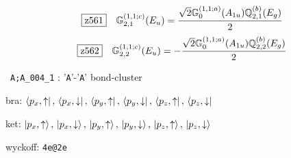 \documentclass[fleqn,10pt,landscape]{jsarticle}
\begin{document}
\begin{dmath*}
\hspace*{3mm}\fbox{z561}\quad \mathbb{G}_{2,1}^{(1,1;c)}(E_{u})=\frac{\sqrt{2} \mathbb{G}_{0}^{(1,1;a)}(A_{1u}) \mathbb{Q}_{2,1}^{(b)}(E_{g})}{2}
\end{dmath*}
\begin{dmath*}
\hspace*{3mm}\fbox{z562}\quad \mathbb{G}_{2,2}^{(1,1;c)}(E_{u})=- \frac{\sqrt{2} \mathbb{G}_{0}^{(1,1;a)}(A_{1u}) \mathbb{Q}_{2,2}^{(b)}(E_{g})}{2}
\end{dmath*}
\vspace{5mm}

\noindent\textbullet\, \texttt{A;A_004_1} : '\texttt{A}'-'\texttt{A}' bond-cluster

\noindent\quad * bra: $\bra{p_{x},\uparrow},\, \bra{p_{x},\downarrow},\, \bra{p_{y},\uparrow},\, \bra{p_{y},\downarrow},\, \bra{p_{z},\uparrow},\, \bra{p_{z},\downarrow}$

\noindent\quad * ket: $\ket{p_{x},\uparrow},\, \ket{p_{x},\downarrow},\, \ket{p_{y},\uparrow},\, \ket{p_{y},\downarrow},\, \ket{p_{z},\uparrow},\, \ket{p_{z},\downarrow}$

\noindent\quad * wyckoff: \texttt{4e@2e}
\end{document}
